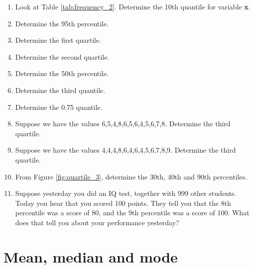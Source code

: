 \begin{enumerate}
\item Look at Table \ref{tab:frequency_2}. Determine the 10th quantile for variable \textbf{x}.

\item Determine the 95th percentile.

\item Determine the first quartile.

\item Determine the second quartile.

\item Determine the 50th percentile.

\item Determine the third quantile.

\item Determine the 0.75 quantile.

\item Suppose we have the values {6,5,4,8,6,5,6,4,5,6,7,8}. Determine the third quartile.

\item Suppose we have the values {4,4,4,8,6,4,6,4,5,6,7,8,9}. Determine the third quartile.

\item From Figure \ref{fig:quartile_3}, determine the 30th, 40th and 90th percentiles.

\begin{kframe}


{\ttfamily\noindent\bfseries{}}

{\ttfamily\noindent\bfseries{}}\end{kframe}

\item Suppose yesterday you did an IQ test, together with 999 other students. Today you hear that you scored 100 points. They tell you that the 8th percentile was a score of 80, and the 9th percentile was a score of 100. What does that tell you about your performance yesterday?


\end{enumerate}






\section{Mean, median and mode}

